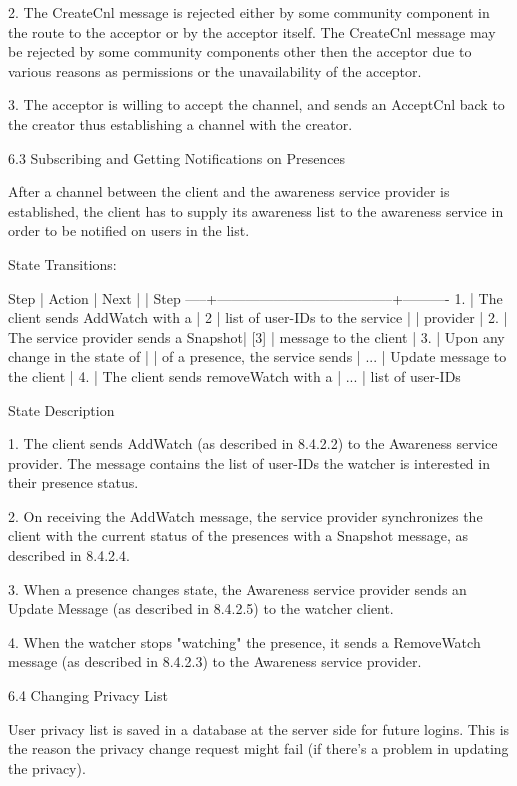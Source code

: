\documentclass[titlepage,oneside]{book}
\begin{document}
2. The CreateCnl message is rejected either by some community component
in the route to the acceptor or by the acceptor itself. The CreateCnl
message may be rejected by some community components other then the
acceptor due to various reasons as permissions or the unavailability of
the acceptor.

3. The acceptor is willing to accept the channel, and sends an
AcceptCnl back to the creator thus establishing a channel with the
creator.

6.3 Subscribing and Getting Notifications on Presences

After a channel between the client and the awareness service provider
is established, the client has to supply its awareness list to the
awareness service in order to be notified on users in the list.

State Transitions:

Step | Action                               |  Next
     |                                      |  Step
-----+--------------------------------------+----------
1.   | The client sends AddWatch with a     |  2
     | list of user-IDs to the service      |
     | provider                             |
2.   | The service provider sends a Snapshot| [3]
     | message to the client                |
3.   | Upon any change in the state of      |
     | of a presence, the service sends     | ...
     | Update message to the client         |
4.   | The client sends removeWatch with a  | ...
     | list of user-IDs

State Description

1. The client sends AddWatch (as described in 8.4.2.2) to the
Awareness service provider. The message contains the list of user-IDs
the watcher is interested in their presence status.

2. On receiving the AddWatch message, the service provider synchronizes
the client with the current status of the presences with a Snapshot
message, as described in 8.4.2.4.

3. When a presence changes state, the Awareness service provider sends
an Update Message (as described in 8.4.2.5) to the watcher client.

4. When the watcher stops "watching" the presence, it sends a
RemoveWatch message (as described in 8.4.2.3) to the Awareness
service provider.

6.4 Changing Privacy List

User privacy list is saved in a database at the server side for future
logins. This is the reason the privacy change request might fail (if
there's a problem in updating the privacy).
\end{document}
